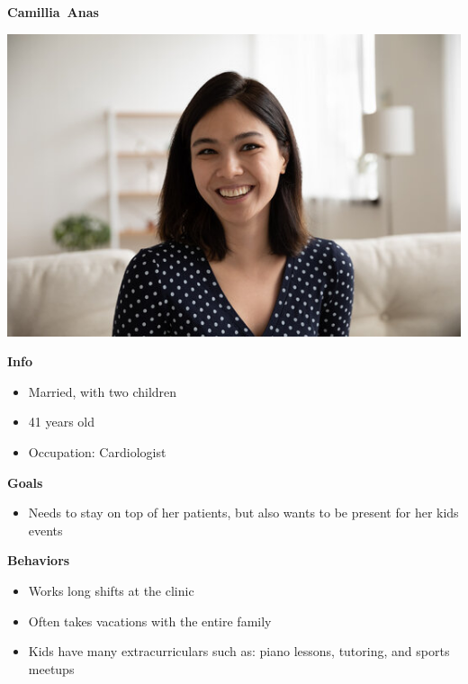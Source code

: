 \textbf{Camillia~Anas}

\includegraphics{../common/personas/res/Camillia.jpg}

\textbf{Info}
\begin{itemize}
  \item Married, with two children
  \item 41 years old
  \item Occupation: Cardiologist
\end{itemize}

\textbf{Goals}
\begin{itemize}
  \item Needs to stay on top of her patients, but also wants to be present for her kids events
\end{itemize}

\textbf{Behaviors}
\begin{itemize}
  \item Works long shifts at the clinic
  \item Often takes vacations with the entire family
  \item Kids have many extracurriculars such as: piano lessons, tutoring, and sports meetups
\end{itemize}
